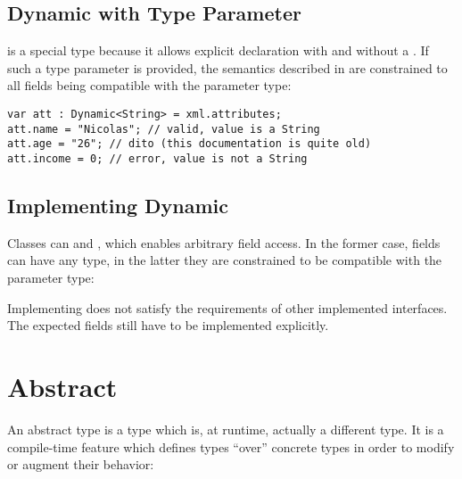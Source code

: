 
\subsection{Dynamic with Type Parameter}
\label{types-dynamic-with-type-parameter}

 is a special type because it allows explicit declaration with and without a . If such a type parameter is provided, the semantics described in  are constrained to all fields being compatible with the parameter type:

\begin{lstlisting}
var att : Dynamic<String> = xml.attributes;
att.name = "Nicolas"; // valid, value is a String
att.age = "26"; // dito (this documentation is quite old)
att.income = 0; // error, value is not a String
\end{lstlisting}


\subsection{Implementing Dynamic}
\label{types-dynamic-implemented}

Classes can   and , which enables arbitrary field access. In the former case, fields can have any type, in the latter they are constrained to be compatible with the parameter type:

Implementing  does not satisfy the requirements of other implemented interfaces. The expected fields still have to be implemented explicitly.





\section{Abstract}
\label{types-abstract}

An abstract type is a type which is, at runtime, actually a different type. It is a compile-time feature which defines types ``over'' concrete types in order to modify or augment their behavior:


